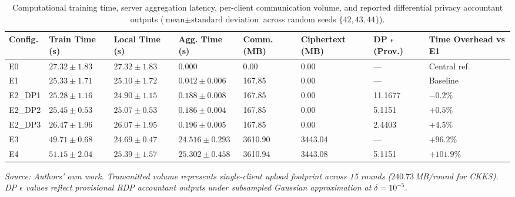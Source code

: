 \begin{table}[H]
\centering
\scriptsize
\setlength{\tabcolsep}{2.2pt}
\renewcommand{\arraystretch}{1.14}
\caption{Computational training time, server aggregation latency, per-client communication volume, and reported differential privacy accountant outputs ($\text{mean} \pm \text{standard deviation}$ across random seeds $\{42, 43, 44\}$).}
\label{tab:overhead_results}
\begin{tabularx}{\textwidth}{>{\raggedright\arraybackslash}X*{7}{Y}}
\toprule
\textbf{Config.} & \textbf{Train Time (s)} & \textbf{Local Time (s)} & \textbf{Agg. Time (s)} & \textbf{Comm. (MB)} & \textbf{Ciphertext (MB)} & \textbf{DP $\epsilon$ (Prov.)} & \textbf{Time Overhead vs E1} \\
\midrule
E0 & $27.32 \pm 1.83$ & $27.32 \pm 1.83$ & 0.000 & 0.00 & 0.00 & --- & Central ref. \\
E1 & $25.33 \pm 1.71$ & $25.10 \pm 1.72$ & $0.042 \pm 0.006$ & 167.85 & 0.00 & --- & Baseline \\
E2\_DP1 & $25.28 \pm 1.16$ & $24.90 \pm 1.15$ & $0.188 \pm 0.008$ & 167.85 & 0.00 & 11.1677 & $-0.2\%$ \\
E2\_DP2 & $25.45 \pm 0.53$ & $25.07 \pm 0.53$ & $0.186 \pm 0.004$ & 167.85 & 0.00 & 5.1151 & $+0.5\%$ \\
E2\_DP3 & $26.47 \pm 1.96$ & $26.07 \pm 1.95$ & $0.196 \pm 0.005$ & 167.85 & 0.00 & 2.4403 & $+4.5\%$ \\
E3 & $49.71 \pm 0.68$ & $24.69 \pm 0.47$ & $24.516 \pm 0.293$ & 3610.90 & 3443.04 & --- & $+96.2\%$ \\
E4 & $51.15 \pm 2.04$ & $25.39 \pm 1.57$ & $25.302 \pm 0.458$ & 3610.94 & 3443.08 & 5.1151 & $+101.9\%$ \\
\bottomrule
\end{tabularx}
\par\smallskip\raggedright\textit{Source: Authors' own work. Transmitted volume represents single-client upload footprint across 15 rounds ($240.73$\,MB/round for CKKS). DP $\epsilon$ values reflect provisional RDP accountant outputs under subsampled Gaussian approximation at $\delta=10^{-5}$.}
\end{table}

\clearpage

